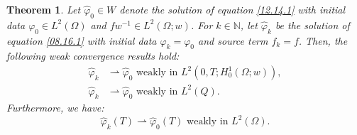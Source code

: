 \documentclass[11pt]{article}
\newtheorem{theorem}{Theorem}[section]
\numberwithin{equation}{section}
\begin{document}
 \begin{theorem}\label{08.16.T1}
Let $\widehat{\varphi}_0 \in W$ denote the solution of equation \eqref{12.14.1} with initial data $\varphi_0 \in L^2(\Omega)$ and $fw^{-1} \in L^2(\Omega;w)$. For $k \in \mathbb{N}$, let $\widehat{\varphi}_k$ be the solution of equation \eqref{08.16.1} with initial data $\varphi_k = \varphi_0$ and source term $f_k = f$. Then, the following weak convergence results hold:
\begin{equation}\label{08.22.1}
\begin{split}
\widehat{\varphi}_k &\rightharpoonup \widehat{\varphi}_0   \text{  weakly in } L^2(0,T; H_0^1(\Omega;w)), \\
\widehat{\varphi}_k &\rightharpoonup \widehat{\varphi}_0   \text{  weakly in } L^2(Q).
\end{split}
\end{equation}
Furthermore, we have:
\begin{equation}\label{12.09.5}
\widehat{\varphi}_k(T) \rightharpoonup \widehat{\varphi}_0(T) \text{  weakly in } L^2(\Omega).
\end{equation}
\end{theorem}
\end{document}
